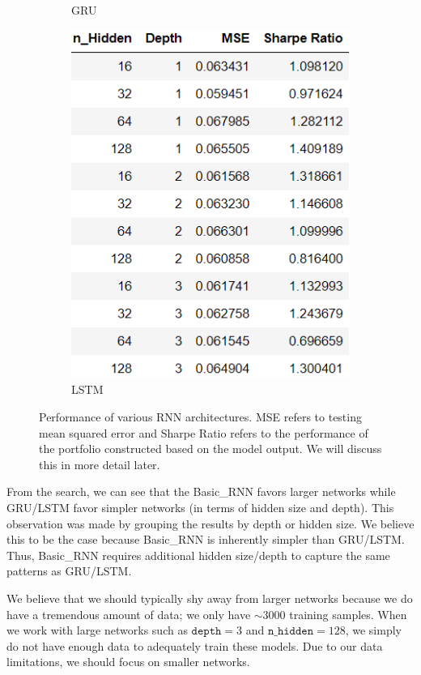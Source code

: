 \documentclass[11pt, letterpaper, headings=standardclasses]{scrartcl}
\begin{document}
\begin{figure}[H]
\begin{subfigure}{.33\textwidth}
      \caption{GRU}
      \label{fig:sub1}
    \end{subfigure}%
    \begin{subfigure}{.33\textwidth}
      \centering
      \includegraphics[width=.9\linewidth]{LSTM.png}
      \caption{LSTM}
      \label{fig:sub2}
    \end{subfigure}
    \caption{Performance of various RNN architectures. MSE refers to testing mean squared error and Sharpe Ratio refers to the performance of the portfolio constructed based on the model output. We will discuss this in more detail later.}
    \label{fig:test}
    \end{figure}
    
	From the search, we can see that the Basic\_RNN favors larger networks while GRU/LSTM favor simpler networks (in terms of hidden size and depth). This observation was made by grouping the results by depth or hidden size. We believe this to be the case because Basic\_RNN is inherently simpler than GRU/LSTM. Thus, Basic\_RNN requires additional hidden size/depth to capture the same patterns as GRU/LSTM.

	We believe that we should typically shy away from larger networks because we do have a tremendous amount of data; we only have $\sim3000$ training samples. When we work with large networks such as $\texttt{depth}=3$ and $\texttt{n\_hidden}=128$, we simply do not have enough data to adequately train these models. Due to our data limitations, we should focus on smaller networks.
\end{document}
